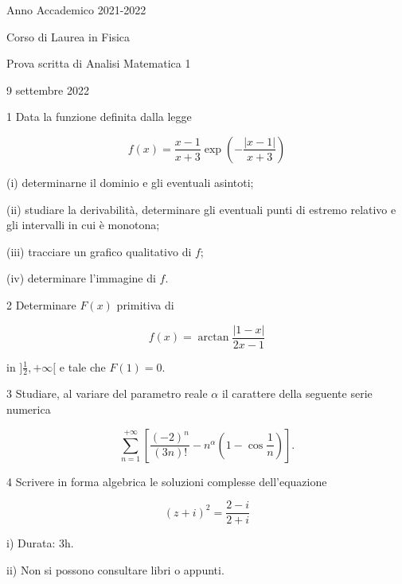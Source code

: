 \documentclass[10pt]{article}
\begin{document}
Anno Accademico 2021-2022

Corso di Laurea in Fisica

Prova scritta di Analisi Matematica 1

9 settembre 2022

1 Data la funzione definita dalla legge

\[
f(x)=\frac{x-1}{x+3} \exp \left(-\frac{|x-1|}{x+3}\right)
\]

(i) determinarne il dominio e gli eventuali asintoti;

(ii) studiare la derivabilità, determinare gli eventuali punti di estremo relativo e gli intervalli in cui è monotona;

(iii) tracciare un grafico qualitativo di \(f\);

(iv) determinare l'immagine di \(f\).

2 Determinare \(F(x)\) primitiva di

\[
f(x)=\arctan \frac{|1-x|}{2 x-1}
\]

in \(] \frac{1}{2},+\infty[\) e tale che \(F(1)=0\).

3 Studiare, al variare del parametro reale \(\alpha\) il carattere della seguente serie numerica

\[
\sum_{n=1}^{+\infty}\left[\frac{(-2)^{n}}{(3 n) !}-n^{\alpha}\left(1-\cos \frac{1}{n}\right)\right] .
\]

4 Scrivere in forma algebrica le soluzioni complesse dell'equazione

\[
(z+i)^{2}=\frac{2-i}{2+i}
\]

i) Durata: 3h.

ii) Non si possono consultare libri o appunti.
\end{document}
